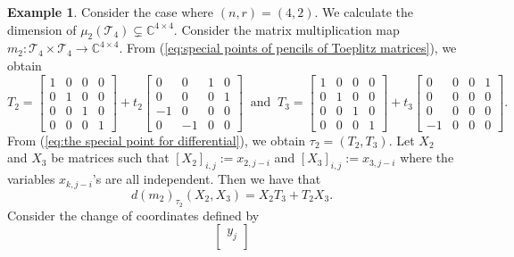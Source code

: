 \documentclass[reqno]{amsart}
\theoremstyle{definition}
\newtheorem{example}[theorem]{Example}
\numberwithin{equation}{section}
\begin{document}
\begin{example}
    Consider the case where $(n,r)=(4,2)$. We calculate the dimension of $\mu_2(\mathcal{T}_4) \subsetneq \mathbb{C}^{4 \times 4}$. Consider the matrix multiplication map $m_2:\mathcal{T}_4 \times \mathcal{T}_4 \rightarrow \mathbb{C}^{4 \times 4}$. From (\ref{eq:special points of pencils of Toeplitz matrices}), we obtain
    \begin{equation*}
        T_2=\begin{bmatrix}
            1 & 0 & 0 & 0\\
            0 & 1 & 0 & 0\\
            0 & 0 & 1 & 0\\
            0 & 0 & 0 & 1
        \end{bmatrix}+t_2\begin{bmatrix}
            0 & 0 & 1 & 0\\
            0 & 0 & 0 & 1\\
            -1 & 0 & 0 & 0\\
            0 & -1 & 0 & 0 
        \end{bmatrix}~\text{ and }~ T_3=\begin{bmatrix}
            1 & 0 & 0 & 0\\
            0 & 1 & 0 & 0\\
            0 & 0 & 1 & 0\\
            0 & 0 & 0 & 1
        \end{bmatrix}+t_3\begin{bmatrix}
            0 & 0 & 0 & 1\\
            0 & 0 & 0 & 0\\
            0 & 0 & 0 & 0\\
            -1 & 0 & 0 & 0 
        \end{bmatrix}.
    \end{equation*}
    From (\ref{eq:the special point for differential}), we obtain $\tau_2=(T_2,T_3)$. Let $X_2$ and $X_3$ be matrices such that $[X_2]_{i,j}:=x_{2,j-i}$ and $[X_{3}]_{i,j}:=x_{3,j-i}$ where the variables $x_{k,j-i}$'s are all independent. Then we have that
    \begin{equation*}
        d(m_2)_{\tau_2}(X_2,X_3)=X_2T_3+T_2X_3.
    \end{equation*}
    Consider the change of coordinates defined by
    \begin{equation}\label{eq:change of coordinates 1}
        \begin{bmatrix}
            y_j\\

\end{bmatrix}
\end{equation}
\end{example}
\end{document}
